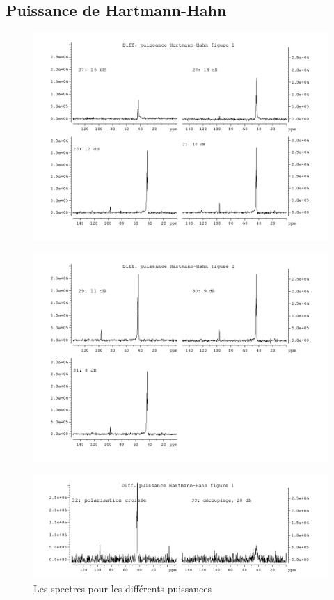 \documentclass[a4paper,12pt]{scrartcl}
\begin{document}
  \subsection{Puissance de Hartmann-Hahn}
 \begin{figure}[H]
    \includegraphics[width=\textwidth]{bilder/figure5.png}
  \end{figure}
\begin{figure}[H]
    \includegraphics[width=\textwidth]{bilder/figure6.png}
  \end{figure}
\begin{figure}[H]
 \includegraphics[width=\textwidth]{bilder/figure7.png}
    \caption{Les spectres pour les différents puissances}
   \end{figure}
 
\end{document}
